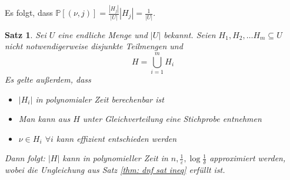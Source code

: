 \documentclass[a4paper, 12pt]{article}
\theoremstyle{plain}
\newtheorem{theorem}{Satz}[section] %
\theoremstyle{definition}
\theoremstyle{lemma}
\theoremstyle{remark}
\theoremstyle{corollary}
\theoremstyle{example}
\begin{document}
	Es folgt, dass $\mathbb{P}[(\nu,j)] = \frac{\left|H_j\right|}{\left|U\right|} \left|H_j\right| = \frac{1}{\left|U\right|}$.
	\begin{theorem}
		Sei $U$ eine endliche Menge und $\left|U\right|$ bekannt. Seien $H_1,H_2,\dots H_m \subseteq U$ nicht notwendigerweise disjunkte Teilmengen und \[H = \bigcup_{i=1}^m H_i\] Es gelte außerdem, dass \begin{itemize}
			\item $\left|H_i\right|$ in polynomialer Zeit berechenbar ist
			\item Man kann aus $H$ unter Gleichverteilung eine Stichprobe entnehmen
			\item $\nu \in H_i$ $\forall i$ kann effizient entschieden werden
		\end{itemize}
		Dann folgt: $\left|H\right|$ kann in polynomieller Zeit in $n, \frac{1}{\varepsilon}, \log \frac{1}{\delta}$ approximiert werden, wobei die Ungleichung aus Satz \ref{thm: dnf sat ineq} erfüllt ist.
	\end{theorem}
\end{document}
